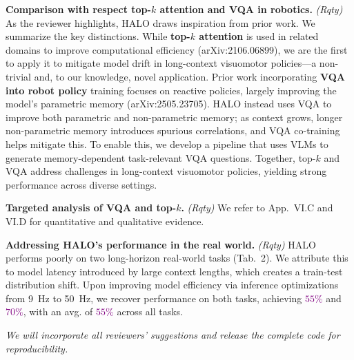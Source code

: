 \documentclass[conference]{IEEEtran}
\newcommand{\hlt}[1]{\textcolor{purple}{#1}}
\newcommand{\rutav}[1]{\textcolor{blue}{RS: #1}}
\begin{document}
\noindent
\textbf{Comparison with respect top-$k$ attention and VQA in robotics.} \textit{(Rqty)}
As the reviewer highlights, HALO draws inspiration from prior work. We summarize the key distinctions. While \textbf{top-$k$ attention} is used in related domains to improve computational efficiency (arXiv:2106.06899), we are the first to apply it to mitigate model drift in long-context visuomotor policies---a non-trivial and, to our knowledge, novel application. Prior work incorporating \textbf{VQA into robot policy} training focuses on reactive policies, largely improving the model's parametric memory (arXiv:2505.23705). HALO instead uses VQA to improve both parametric and non-parametric memory; as context grows, longer non-parametric memory introduces spurious correlations, and VQA co-training helps mitigate this.
To enable this, we develop a pipeline that uses VLMs to generate memory-dependent task-relevant VQA questions.
Together, top-$k$ and VQA address challenges in long-context visuomotor policies, yielding strong performance across diverse settings.
 
\noindent
\textbf{Targeted analysis of VQA and top-$k$.} \textit{(Rqty)} We refer to App.~VI.C and VI.D for quantitative and qualitative evidence.
 
\noindent
\textbf{Addressing HALO's performance in the real world.} \textit{(Rqty)}
HALO performs poorly on two long-horizon real-world tasks (Tab.~2). We attribute this to model latency introduced by large context lengths, which creates a train-test distribution shift. Upon improving model efficiency via inference optimizations from 9~Hz to 50~Hz, we recover performance on both tasks, achieving \hlt{$55\%$} and \hlt{$70\%$}, with an avg. of \hlt{$55\%$} across all tasks.

    
% 
 
\noindent
\textit{We will incorporate all reviewers' suggestions and release the complete code for reproducibility.}
\end{document}

